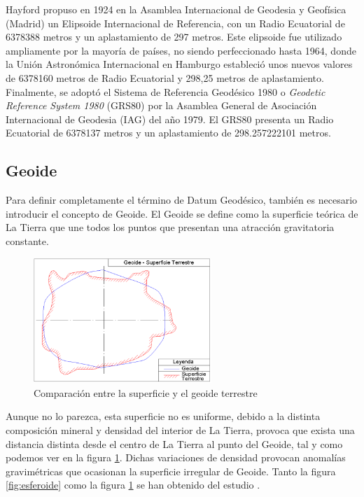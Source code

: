 Hayford propuso en 1924 en la Asamblea Internacional de Geodesia y Geofísica (Madrid) un Elipsoide Internacional de Referencia, 
con un Radio Ecuatorial de 6378388 metros y un aplastamiento de 297 metros.
Este elipsoide fue utilizado ampliamente por la mayoría de países, no siendo perfeccionado hasta 1964,
donde la Unión Astronómica Internacional en Hamburgo estableció unos nuevos valores de 6378160 metros de Radio Ecuatorial y 298,25 metros de aplastamiento.
Finalmente, se adoptó el Sistema de Referencia Geodésico 1980 o \textit{Geodetic Reference System 1980} (GRS80) por la Asamblea General de Asociación Internacional de Geodesia (IAG) del año 1979.
El GRS80 presenta un Radio Ecuatorial de 6378137 metros y un aplastamiento de 298.257222101 metros. 

\subsection{Geoide}

Para definir completamente el término de Datum Geodésico, también es necesario introducir el concepto de Geoide.
El Geoide se define como la superficie teórica de La Tierra que une todos los puntos que presentan una atracción gravitatoria constante. 

\begin{figure}[H]
  \centering
  \includegraphics[width=0.60\textwidth]{Imagenes/CRS/geoide.png}
  \caption{Comparación entre la superficie y el geoide terrestre} \label{fig:geoide}
\end{figure}

Aunque no lo parezca, esta superficie no es uniforme, debido a la distinta composición mineral y densidad del interior de La Tierra,
provoca que exista una distancia distinta desde el centro de La Tierra al punto del Geoide, tal y como podemos ver en la figura \ref{fig:geoide}. 
Dichas variaciones de densidad provocan anomalías gravimétricas que ocasionan la superficie irregular de Geoide.
Tanto la figura \ref{fig:esferoide} como la figura \ref{fig:geoide} se han obtenido del estudio \cite{DATUM}.

